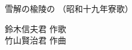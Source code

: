 \documentclass[10pt,b5j]{tarticle} %
\begin{document}
\begin{minipage}[c]{0.7\hsize} %
    \begin{center}
        {\LARGE
            雪解の楡陵の %
        }
        {\small 
            （昭和十九年寮歌） %
        }
    \end{center}
\end{minipage}
\begin{minipage}[c]{0.3\hsize} %
    \begin{flushright} %
        鈴木信夫君 作歌\\竹山賢治君 作曲 %
    \end{flushright}
\end{minipage}
\end{document}
